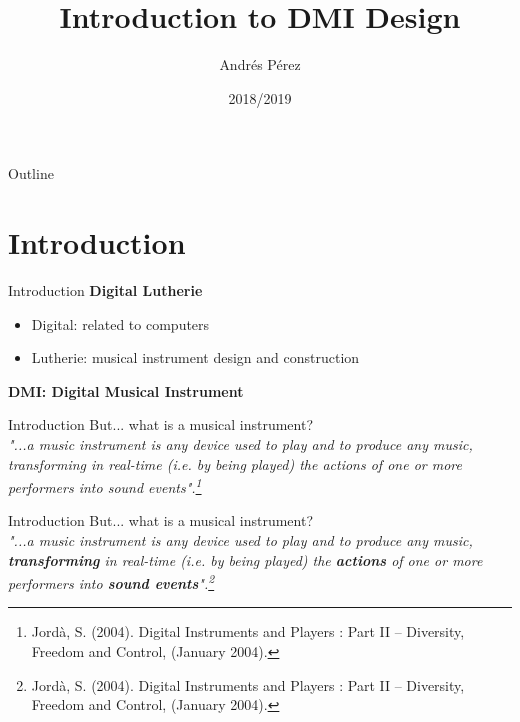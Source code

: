 \documentclass{beamer}
\title[DMI Design]{Introduction to DMI Design}
\author{Andrés Pérez}
\institute{Digital Lutherie\\Master en Música para Experiencias del Entretenimiento\\ENTI-UB}
\date{2018/2019}
\begin{document}
\begin{frame}
  \titlepage
\end{frame}



\begin{frame}{Outline}
 \tableofcontents
\end{frame}

\section{Introduction}

\begin{frame}{Introduction}
    \textbf{Digital Lutherie}
    \begin{itemize}
        \item Digital: related to computers
        \item Lutherie: musical instrument design and construction
    \end{itemize}
    \vspace{5mm}
    \textbf{DMI: Digital Musical Instrument}
\end{frame}

\begin{frame}{Introduction}
    But... what is a musical instrument?\\
    \vspace{5mm}
    \textit{    "...a music instrument is any device used to play and to produce any music, transforming in real-time (i.e. by being played) the actions of one or more performers into sound events".\footnote{Jordà, S. (2004). Digital Instruments and Players : Part II – Diversity, Freedom and Control, (January 2004).}}
\end{frame}

\begin{frame}{Introduction}
    But... what is a musical instrument?\\
    \vspace{5mm}
    \textit{    "...a music instrument is any device used to play and to produce any music, \textbf{transforming} in real-time (i.e. by being played) the \textbf{actions} of one or more performers into \textbf{sound events}".\footnote{Jordà, S. (2004). Digital Instruments and Players : Part II – Diversity, Freedom and Control, (January 2004).}}
\end{frame}
\end{document}
